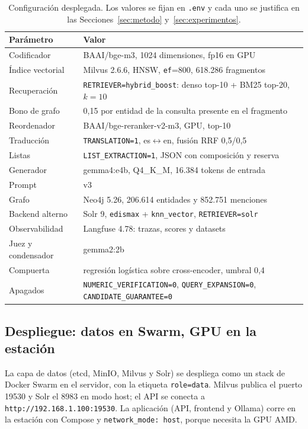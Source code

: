 \begin{table}[t]
\centering
\footnotesize
\caption{Configuraci\'on desplegada. Los valores se fijan en \texttt{.env} y cada uno se justifica en las Secciones~\ref{sec:metodo} y~\ref{sec:experimentos}.}
\label{tab:config-final}
\begin{tabular}{ll}
\toprule
Par\'ametro & Valor \\
\midrule
Codificador & BAAI/bge-m3, 1024 dimensiones, fp16 en GPU \\
\'Indice vectorial & Milvus 2.6.6, HNSW, \texttt{ef}=800, 618.286 fragmentos \\
Recuperaci\'on & \texttt{RETRIEVER=hybrid\_boost}: denso top-10 + BM25 top-20, $k=10$ \\
Bono de grafo & 0,15 por entidad de la consulta presente en el fragmento \\
Reordenador & BAAI/bge-reranker-v2-m3, GPU, top-10 \\
Traducci\'on & \texttt{TRANSLATION=1}, es$\leftrightarrow$en, fusi\'on RRF 0,5/0,5 \\
Listas & \texttt{LIST\_EXTRACTION=1}, JSON con composici\'on y reserva \\
Generador & gemma4:e4b, Q4\_K\_M, 16.384 tokens de entrada \\
Prompt & v3 \\
Grafo & Neo4j 5.26, 206.614 entidades y 852.751 menciones \\
Backend alterno & Solr 9, \texttt{edismax} + \texttt{knn\_vector}, \texttt{RETRIEVER=solr} \\
Observabilidad & Langfuse 4.78: trazas, scores y datasets \\
Juez y condensador & gemma2:2b \\
Compuerta & regresi\'on log\'istica sobre cross-encoder, umbral 0,4 \\
Apagados & \texttt{NUMERIC\_VERIFICATION=0}, \texttt{QUERY\_EXPANSION=0}, \texttt{CANDIDATE\_GUARANTEE=0} \\
\bottomrule
\end{tabular}
\end{table}

\subsection{Despliegue: datos en Swarm, GPU en la estaci\'on}

La capa de datos (etcd, MinIO, Milvus y Solr) se despliega como un stack de Docker Swarm en el servidor, con la etiqueta \texttt{role=data}. Milvus publica el puerto 19530 y Solr el 8983 en modo host; el API se conecta a \texttt{http://192.168.1.100:19530}. La aplicaci\'on (API, frontend y Ollama) corre en la estaci\'on con Compose y \texttt{network\_mode: host}, porque necesita la GPU AMD.

